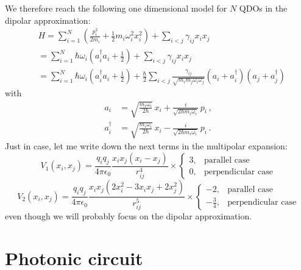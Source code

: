 \documentclass[reprint, amsmath, amssymb, aps]{revtex4-2}
\begin{document}
    We therefore reach the following one dimensional model for $N$ QDOs in the dipolar approximation:
    \begin{equation}
        \label{eq:hamiltonian_N_qdos}
        \begin{split}
            &H = \sum_{i=1}^N\left(\frac{p_i^2}{2m_i}+\frac{1}{2}m_i\omega_i^2 x_i^2\right) + \sum_{i<j}\gamma_{ij}x_ix_j\\
            &= \sum_{i=1}^N\hbar\omega_i\left(a_i^\dagger a_i+\frac{1}{2}\right) + \sum_{i<j}\gamma_{ij}x_ix_j\\
            &= \sum_{i=1}^N\hbar\omega_i\left(a_i^\dagger a_i+\frac{1}{2}\right) + \frac{\hbar}{2}\sum_{i<j}\frac{\gamma_{ij}}{\sqrt{m_im_j\omega_i\omega_j}}\left(a_i+a_i^\dagger\right)\left(a_j+a_j^\dagger\right)
        \end{split}
    \end{equation}
    with
    \begin{equation}
        \begin{split}
            a_i &= \sqrt{\frac{m_i\omega_i}{2\hbar}}\,x_i+\frac{i}{\sqrt{2\hbar m_i\omega_i}}\,p_i\,,\\
            a_i^\dagger &= \sqrt{\frac{m_i\omega_i}{2\hbar}}\,x_i-\frac{i}{\sqrt{2\hbar m_i\omega_i}}\,p_i\,.
        \end{split}
    \end{equation}
    Just in case, let me write down the next terms in the multipolar expansion:
    \begin{equation}
        V_1(x_i, x_j) = \frac{q_iq_j}{4\pi\epsilon_0}\frac{x_ix_j(x_i-x_j)}{r_{ij}^4}\times
        \begin{cases}
            3, & \text{parallel case} \\
            0, & \text{perpendicular case}
        \end{cases}
    \end{equation}
    \begin{equation}
        V_2(x_i, x_j) = \frac{q_iq_j}{4\pi\epsilon_0}\frac{x_ix_j(2x_i^2-3x_ix_j+2x_j^2)}{r_{ij}^5}\times
        \begin{cases}
            -2, & \text{parallel case} \\
            -\frac{3}{4}, & \text{perpendicular case}
        \end{cases}
    \end{equation}
    even though we will probably focus on the dipolar approximation.

\section{Photonic circuit}
\end{document}
